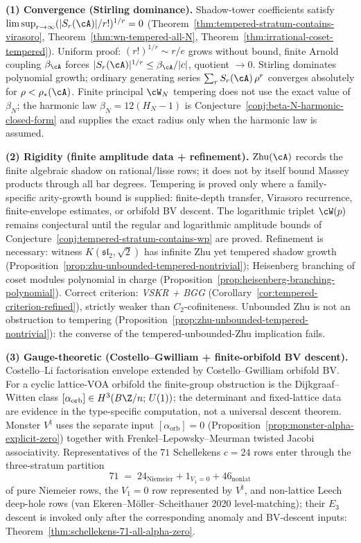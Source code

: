 \smallskip\textbf{(1) Convergence (Stirling dominance).}
Shadow-tower coefficients satisfy
$\limsup_{r \to \infty}(|S_r(\cA)|/r!)^{1/r} = 0$
(Theorem~\ref{thm:tempered-stratum-contains-virasoro},
Theorem~\ref{thm:wn-tempered-all-N},
Theorem~\ref{thm:irrational-coset-tempered}). Uniform proof:
$(r!)^{1/r} \sim r/e$ grows without bound, finite Arnold coupling
$\beta_\cA$ forces $|S_r(\cA)|^{1/r} \le \beta_\cA/|c|$, quotient
$\to 0$. Stirling dominates polynomial growth; ordinary
generating series $\sum_r S_r(\cA)\,\rho^r$ converges absolutely
for $\rho < \rho_*(\cA)$. Finite principal $\cW_N$ tempering does not
use the exact value of $\beta_N$; the harmonic law
$\beta_N = 12(H_N - 1)$ is
Conjecture~\ref{conj:beta-N-harmonic-closed-form} and supplies
the exact radius only when the harmonic law is assumed.

\smallskip\textbf{(2) Rigidity (finite amplitude data + refinement).}
$\mathrm{Zhu}(\cA)$ records the finite algebraic shadow on
rational/lisse rows; it does not by itself bound Massey products
through all bar degrees.  Tempering is proved only where a
family-specific arity-growth bound is supplied: finite-depth transfer,
Virasoro recurrence, finite-envelope estimates, or orbifold BV descent.
The logarithmic triplet $\cW(p)$ remains conjectural until the regular
and logarithmic amplitude bounds of
Conjecture~\ref{conj:tempered-stratum-contains-wp} are proved.
Refinement is necessary: witness $K(\mathfrak{sl}_2, \sqrt{2})$
has infinite Zhu yet tempered shadow growth
(Proposition~\ref{prop:zhu-unbounded-tempered-nontrivial});
Heisenberg branching of coset modules polynomial in charge
(Proposition~\ref{prop:heisenberg-branching-polynomial}).
Correct criterion: \emph{VSKR + BGG}
(Corollary~\ref{cor:tempered-criterion-refined}), strictly weaker
than $C_2$-cofiniteness. Unbounded Zhu is not an obstruction to tempering
(Proposition~\ref{prop:zhu-unbounded-tempered-nontrivial}):
the converse of the tempered-unbounded-Zhu implication fails.

\smallskip\textbf{(3) Gauge-theoretic (Costello--Gwilliam +
finite-orbifold BV descent).}
Costello--Li factorisation envelope extended by
Costello--Gwilliam orbifold BV. For a cyclic lattice-VOA orbifold
the finite-group obstruction is the Dijkgraaf--Witten class
$[\alpha_{\mathrm{orb}}]\in H^3(B\Z/n;\, U(1))$; the determinant and
fixed-lattice data are evidence in the type-specific computation, not
a universal descent theorem. Monster $V^\natural$ uses the separate
input $[\alpha_{\mathrm{orb}}]=0$
(Proposition~\ref{prop:monster-alpha-explicit-zero}) together with
Frenkel--Lepowsky--Meurman twisted Jacobi associativity. Representatives
of the $71$ Schellekens $c = 24$ rows enter through the three-stratum
partition
\[
71 \;=\; 24_{\mathrm{Niemeier}} + 1_{V_1=0} + 46_{\mathrm{nonlat}}
\]
of pure Niemeier rows, the $V_1=0$ row represented by
$V^\natural$, and non-lattice Leech deep-hole rows
(van Ekeren--M\"oller--Scheithauer 2020 level-matching); their
$E_3$ descent is invoked only after the corresponding anomaly and
BV-descent inputs:
Theorem~\ref{thm:schellekens-71-all-alpha-zero}.

